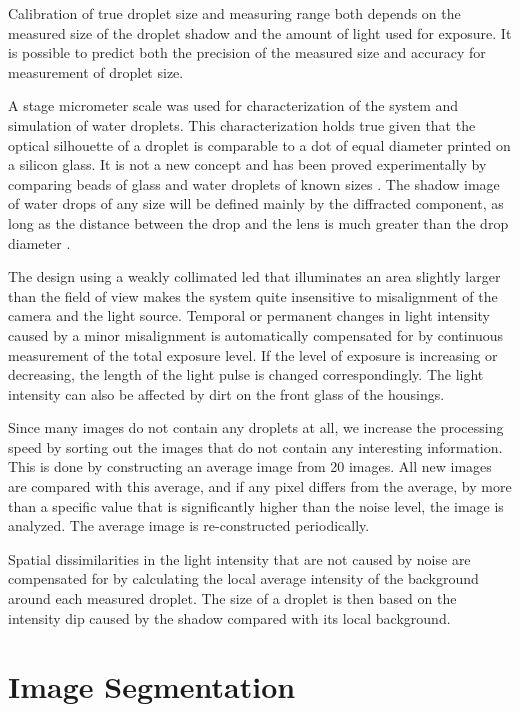 Calibration of true droplet size and measuring range both depends on the measured size of the droplet shadow and the amount of light used for exposure. It is possible to predict both the precision of the measured size and accuracy for measurement of droplet size. 

A stage micrometer scale was used for characterization of the system and simulation of water droplets. This characterization holds true given that the optical silhouette of a droplet is comparable to a dot of equal diameter printed on a silicon glass. It is not a new concept and has been proved experimentally by comparing beads of glass and water droplets of known sizes \cite{koro1991,koro1998}. The shadow image of water drops of any size will be defined mainly by the diffracted component, as long as the distance between the drop and the lens is much greater than the drop diameter \cite{koro1991,wend2013}. 

The design using a weakly collimated \gls{led} that illuminates an area slightly larger than the field of view makes the system quite insensitive to misalignment of the camera and the light source. Temporal or permanent changes in light intensity caused by a minor misalignment is automatically compensated for by continuous measurement of the total exposure level. If the level of exposure is increasing or decreasing, the length of the light pulse is changed correspondingly. The light intensity can also be affected by dirt on the front glass of the housings. 

Since many images do not contain any droplets at all, we increase the processing speed by sorting out the images that do not contain any interesting information. This is done by constructing an average image from 20 images. All new images are compared with this average, and if any pixel differs from the average, by more than a specific value that is significantly higher than the noise level, the image is analyzed. The average image is re-constructed periodically.

Spatial dissimilarities in the light intensity that are not caused by noise are compensated for by calculating the local average intensity of the background around each measured droplet. The size of a droplet is then based on the intensity dip caused by the shadow compared with its local background.


\section{Image Segmentation}
\label{imgsegment}

